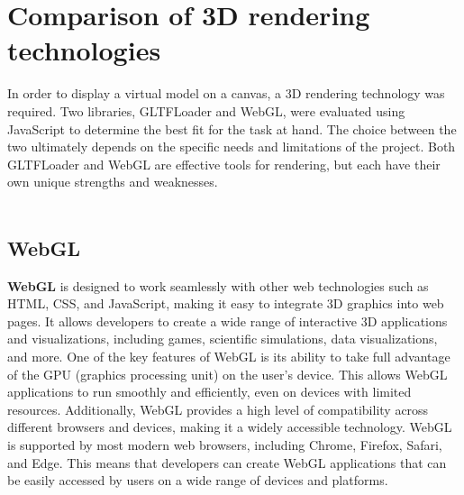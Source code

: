 \section{Comparison of 3D rendering technologies}
In order to display a virtual model on a canvas, a 3D rendering technology was required. Two libraries, 
GLTFLoader and WebGL, were evaluated using JavaScript to determine the best fit for the task at hand. 
The choice between the two ultimately depends on the specific needs and limitations of the project. 
Both GLTFLoader and WebGL are effective tools for rendering, but each have their own 
unique strengths and weaknesses.
\\
\\
\subsection{WebGL}
\textbf{WebGL} is designed to work seamlessly with other web technologies such as HTML, CSS, and JavaScript, 
making it easy to integrate 3D graphics into web pages. It allows developers to create a wide range 
of interactive 3D applications and visualizations, including games, scientific 
simulations, data visualizations, and more.
One of the key features of WebGL is its ability to take full advantage of the GPU 
(graphics processing unit) on the user's device. This allows WebGL applications to 
run smoothly and efficiently, even on devices with limited resources. Additionally, WebGL provides 
a high level of compatibility across different browsers and devices, making it a widely accessible technology.
WebGL is supported by most modern web browsers, including Chrome, Firefox, Safari, and Edge. 
This means that developers can create WebGL applications that can be easily accessed by 
users on a wide range of devices and platforms. \cite{WebGL}
\\
\\
